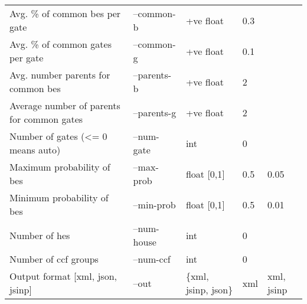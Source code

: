 \begin{longtable}{@{}lllll@{}}
Avg. \% of common \acrshort{be}s per gate     & --common-b  & +ve float       & 0.3     &             \\
Avg. \% of common gates per gate            & --common-g  & +ve float       & 0.1     &             \\
Avg. number parents for common \acrshort{be}s  & --parents-b & +ve float       & 2       &             \\
Average number of parents for common gates  & --parents-g & +ve float           & 2       &             \\
Number of gates (\textless{}= 0 means auto) & --num-gate  & int             & 0       &             \\
Maximum probability of \acrshort{be}s         & --max-prob & float {[}0,1{]} & 0.5     & 0.05        \\
Minimum probability of \acrshort{be}s         & --min-prob  & float {[}0,1{]} & 0.5     & 0.01        \\
Number of \acrfull{he}s                     & --num-house & int             & 0       &             \\
Number of \acrshort{ccf} groups                        & --num-ccf   & int             & 0       &             \\
Output format {[}\acrshort{xml}, \acrshort{json}, \acrshort{jsinp}{]}               & --out       & \{xml, jsinp, json\}   & xml     & xml, jsinp   \\* \bottomrule
\end{longtable}